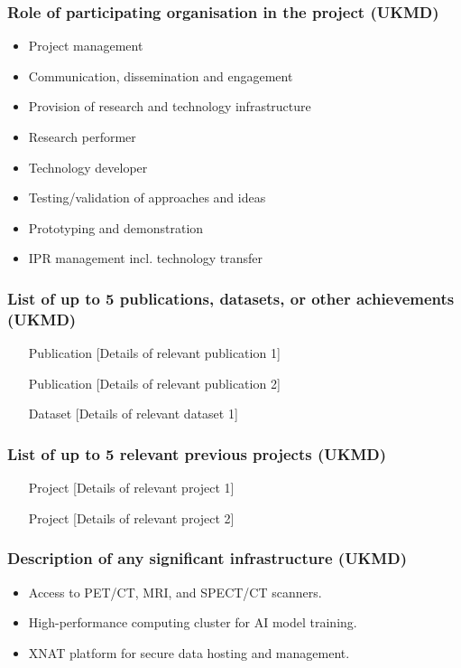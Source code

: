 \documentclass[11pt, a4paper]{article}
\begin{document}
\subsubsection*{Role of participating organisation in the project (UKMD)}
\begin{itemize}
    \item Project management
    \item Communication, dissemination and engagement
    \item Provision of research and technology infrastructure
    \item Research performer
    \item Technology developer
    \item Testing/validation of approaches and ideas
    \item Prototyping and demonstration
    \item IPR management incl. technology transfer
\end{itemize}

\subsubsection*{List of up to 5 publications, datasets, or other achievements (UKMD)}
\begin{itemize}
    \item [Publication] [Details of relevant publication 1]
    \item [Publication] [Details of relevant publication 2]
    \item [Dataset] [Details of relevant dataset 1]
\end{itemize}

\subsubsection*{List of up to 5 relevant previous projects (UKMD)}
\begin{itemize}
    \item [Project] [Details of relevant project 1]
    \item [Project] [Details of relevant project 2]
\end{itemize}

\subsubsection*{Description of any significant infrastructure (UKMD)}
\begin{itemize}
    \item Access to PET/CT, MRI, and SPECT/CT scanners.
    \item High-performance computing cluster for AI model training.
    \item XNAT platform for secure data hosting and management.
\end{itemize}
\end{document}
